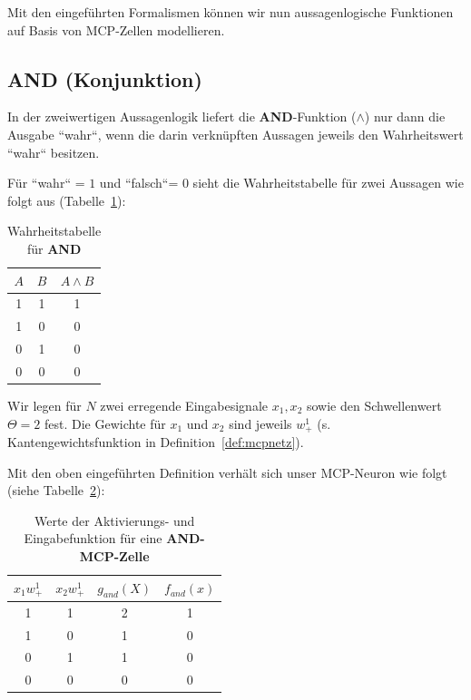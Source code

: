 Mit den eingeführten Formalismen können wir nun aussagenlogische Funktionen auf Basis von MCP-Zellen modellieren.


\subsection*{AND (Konjunktion)}
In der zweiwertigen Aussagenlogik liefert die \textbf{AND}-Funktion ($\land$) nur dann die Ausgabe ``wahr``, wenn die darin verknüpften Aussagen jeweils den Wahrheitswert ``wahr`` besitzen.

Für ``wahr`` = $1$ und ``falsch``= $0$ sieht die Wahrheitstabelle für zwei Aussagen wie folgt aus (Tabelle~\ref{tab:and}):

\setlength{\tabcolsep}{1.5em}
{\renewcommand{\arraystretch}{1.5}%
\begin{table} %
    \centering
    \begin{tabular}{c | c | c }
        \textbf{$A$} & \textbf{$B$} & \textbf{$A \land B$} \\
        \hline
        1  & 1 & 1 \\
        1  & 0 & 0 \\
        0  & 1 & 0 \\
        0  & 0 & 0 \\
    \end{tabular}
    \caption{Wahrheitstabelle für \textbf{AND}}
    \label{tab:and}
\end{table}



Wir legen für $N$ zwei erregende Eingabesignale $x_1, x_2$ sowie den Schwellenwert $\Theta = 2$ fest. Die Gewichte für $x_1$ und $x_2$ sind jeweils $w^1_+$ (s. Kantengewichtsfunktion in Definition~\ref{def:mcpnetz}).

Mit den oben eingeführten Definition verhält sich unser MCP-Neuron wie folgt (siehe Tabelle~\ref{tab:mcp-and}):

\begin{table} %
    \centering
    \begin{tabular}{c | c | c |c }
        $x_1w^1_+$ & $x_2w^1_+$ & $g_{and}(X)$ & $f_{and}(x)$ \\
        \hline
        1     & 1     & 2      &   1   \\
        1     & 0     & 1      &   0   \\
        0     & 1     & 1      &   0   \\
        0     & 0     & 0      &   0   \\
    \end{tabular}
    \caption{Werte der Aktivierungs- und Eingabefunktion für eine \textbf{AND-MCP-Zelle}}
    \label{tab:mcp-and}
\end{table}


}
